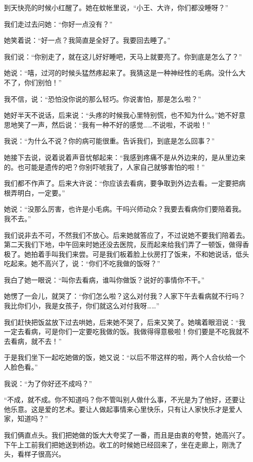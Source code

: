 到天快亮的时候小红醒了。她在蚊帐里说，“小王、大许，你们都没睡呀？” 

我们走过去问她：“你好一点没有？” 

她笑着说：“好一点？我简直是全好了。我要回去睡了。” 

我们说：“你别走了，就在这儿好好睡吧，天马上就要亮了。你到底是怎么了？” 

她说：“嘻，过河的时候头猛然疼起来了。我猜这是一种神经性的毛病。没什么大不了，你们别怕！” 

我不信，说：“恐怕没你说的那么轻巧。你说害怕，那是怎么啦？” 

她好半天不说话，后来说：“头疼的时候我心里特别慌，也不知为什么。”她不好意思地笑了一声，然后说：“我有一种不好的感觉……不说啦，不说啦！” 

我说：“为什么不说？你的病可能很重。告诉我们，到底是怎么回事？” 

她接下去说，说着说着声音忧郁起来：“我感到疼痛不是从外边来的，是从里边来的。也可能是遗传的吧？你别吓唬我了，人家自己就够害怕的啦！” 

我们都不作声了。后来大许说：“你应该去看病，要争取到外边去看。一定要把病根弄明白，一定要。” 

她说：“没那么厉害，也许是小毛病。干吗兴师动众？我要去看病你们要陪着我。我不去。” 

我们说非去不可，不然我们不放心。后来她就答应了，不过说她不要我们陪着去。第二天我们下地，中午回来时她还没去医院，反而起来给我们弄了一顿饭，做得香极了。她拍着手叫我们来尝。可是我们板着脸上伙房打了饭来，不和她说话，低头吃起来。她不高兴了，说：“你们不吃我做的饭呀？” 

我白了她一眼说：“叫你去看病，谁叫你做饭？说好的事情你不干。” 

她愣了一会儿，就哭了：“你们怎么啦？这么对付我？人家下午去看病就不行吗？我比你们小，我是女孩子，你们就这么对付我呀……” 

我们赶快把饭盆放下过去哄她，后来她不哭了，后来又笑了。她噙着眼泪说：“我一定去看病，可是你们一定要吃我做的饭。我做得得意极啦！你们要是不吃我就不去看病，就不去！” 

于是我们坐下一起吃她做的饭，她又说：“以后不带这样的啦，两个人合伙给一个人脸色看。” 

我说：“为了你好还不成吗？” 

“不成，就不成。你不知道吗？你不管叫别人做什么事，不光是为了他好，还要让他乐意。这是爱的艺术。要让人做起事情来心里快乐，只有让人家快乐才是爱人家，知道吗？” 

我们俩直点头。我们把她做的饭大大夸奖了一番，而且是由衷的夸赞，她高兴了。下午上工前我们把她送到桥边。收工的时候她已经回来了，坐在走廊上，刚洗了头，看样子很高兴。 

